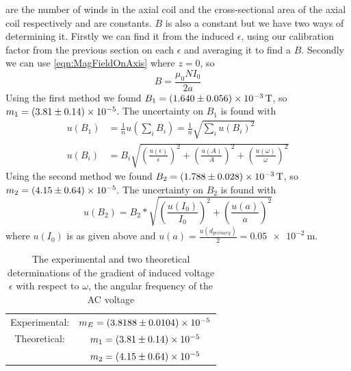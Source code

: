 \documentclass[12pt]{article}
\numberwithin{equation}{section}
\numberwithin{figure}{section}
\numberwithin{table}{section}
\begin{document}
    are the number of winds in the axial coil and the cross-sectional area of the axial coil 
    respectively and are constants. $B$ is also a constant but we have two ways of determining 
    it. Firstly we can find it from the induced $\epsilon$, using our calibration factor from 
    the previous section on each $\epsilon$ and averaging it to find a $B$. Secondly we can 
    use \autoref{eqn:MagFieldOnAxis} where $z=0$, so 
    \begin{equation}
        B=\frac{\mu_0NI_0}{2a}
        \label{eqn:MagFieldAt0}
    \end{equation}
    Using the first method we found $B_1=\SI{1.640\pm0.056e-3}{\tesla}$, so \newline
    $m_1=\num{3.81\pm0.14e-05}$. The uncertainty on $B_1$ is found with 
    \begin{align*}
        u(B_1)&=\frac{1}{n}u(\sum_i B_i) =\frac{1}{n}\sqrt{\sum_i u(B_i)^2}\\
        u(B_i)&=B_i\sqrt{\left( \frac{u(\epsilon)}{\epsilon}\right)^2+\left( \frac{u(A)}{A}\right)^2+\left( \frac{u(\omega)}{\omega}\right)^2}
    \end{align*}
    Using the second method we found $B_2=\SI{1.788\pm0.028e-3}{\tesla}$, so \newline
    $m_2=\num{4.15\pm0.64e-5}$. The uncertainty on $B_2$ is found with
    \begin{equation*}
        u(B_2)=B_2*\sqrt{\left( \frac{u(I_0)}{I_0}\right)^2+\left( \frac{u(a)}{a}\right)^2}
    \end{equation*}
    where $u(I_0)$ is as given above and $u(a)=\frac{u(d_{primary})}{2}=\SI{0.05e-2}{\metre}$.
    \begin{table}[H]
        \centering
        \begin{tabular}{c c}
            Experimental: & $m_E = \num{3.8188\pm0.0104e-05}$\\
            Theoretical: & $m_1 = \num{3.81\pm0.14e-05}$\\
            & $m_2 = \num{4.15\pm0.64e-5}$
        \end{tabular}
        \caption{The experimental and two theoretical determinations of the gradient of 
        induced voltage $\epsilon$ with respect to $\omega$, the angular frequency of the AC voltage}
    \end{table}
    
\end{document}
